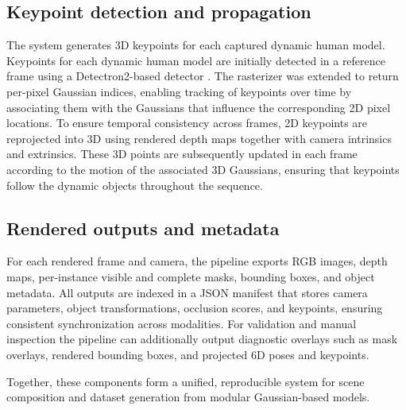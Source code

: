 \subsection{Keypoint detection and propagation}
The system generates 3D keypoints for each captured dynamic human model. Keypoints for each dynamic human model are initially detected in a reference frame using a Detectron2-based detector \cite{Detectron22020}. The rasterizer was extended to return per-pixel Gaussian indices, enabling tracking of keypoints over time by associating them with the Gaussians that influence the corresponding 2D pixel locations. To ensure temporal consistency across frames, 2D keypoints are reprojected into 3D using rendered depth maps together with camera intrinsics and extrinsics. These 3D points are subsequently updated in each frame according to the motion of the associated 3D Gaussians, ensuring that keypoints follow the dynamic objects throughout the sequence.

\subsection{Rendered outputs and metadata}
For each rendered frame and camera, the pipeline exports RGB images, depth maps, per-instance visible and complete masks, bounding boxes, and object metadata.
All outputs are indexed in a JSON manifest that stores camera parameters, object transformations, occlusion scores, and keypoints, ensuring consistent synchronization across modalities.
For validation and manual inspection the pipeline can additionally output diagnostic overlays such as mask overlays, rendered bounding boxes, and projected 6D poses and keypoints.

\smallskip
Together, these components form a unified, reproducible system for scene composition and dataset generation from modular Gaussian-based models.
